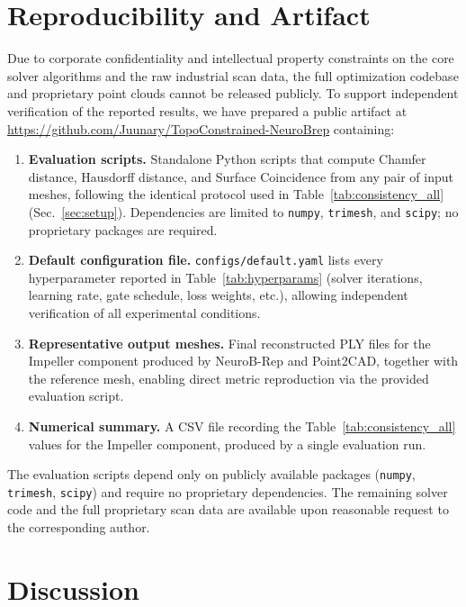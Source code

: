 \documentclass{ieeeaccess}
\begin{document}
\section{Reproducibility and Artifact}
\label{sec:artifact}
Due to corporate confidentiality and intellectual property constraints
on the core solver algorithms and the raw industrial scan data,
the full optimization codebase and proprietary point clouds cannot be
released publicly.
To support independent verification of the reported results, we have
prepared a public artifact at
\url{https://github.com/Juunary/TopoConstrained-NeuroBrep}
containing:
\begin{enumerate}
  \item \textbf{Evaluation scripts.} Standalone Python scripts that compute
        Chamfer distance, Hausdorff distance, and Surface Coincidence
        from any pair of input meshes, following the identical protocol
        used in Table~\ref{tab:consistency_all} (Sec.~\ref{sec:setup}).
        Dependencies are limited to \texttt{numpy}, \texttt{trimesh},
        and \texttt{scipy}; no proprietary packages are required.
  \item \textbf{Default configuration file.}
        \texttt{configs/default.yaml} lists every hyperparameter reported
        in Table~\ref{tab:hyperparams} (solver iterations, learning rate,
        gate schedule, loss weights, etc.), allowing independent
        verification of all experimental conditions.
  \item \textbf{Representative output meshes.} Final reconstructed PLY files
        for the Impeller component produced by NeuroB-Rep and Point2CAD,
        together with the reference mesh, enabling direct metric
        reproduction via the provided evaluation script.
  \item \textbf{Numerical summary.} A CSV file recording the
        Table~\ref{tab:consistency_all} values for the Impeller component,
        produced by a single evaluation run.
\end{enumerate}
The evaluation scripts depend only on publicly available packages
(\texttt{numpy}, \texttt{trimesh}, \texttt{scipy}) and require no
proprietary dependencies.
The remaining solver code and the full proprietary scan data are
available upon reasonable request to the corresponding author.


\section{Discussion}
\label{sec:discussion}
\end{document}
